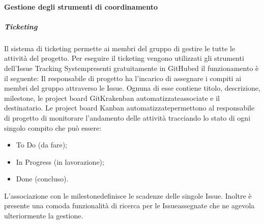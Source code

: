 			\paragraph{Gestione degli strumenti di coordinamento}
				\subparagraph*{Ticketing}
					Il sistema di ticketing permette ai membri del gruppo di gestire le tutte le attività del progetto.
					Per eseguire il ticketing vengono utilizzati gli strumenti dell'Issue Tracking System\glosp presenti gratuitamente in GitHub\glosp ed il funzionamento è il seguente:
					Il responsabile di progetto ha l'incarico di assegnare i compiti ai membri del gruppo attraverso le Issue\glosp. Ognuna di esse contiene titolo, descrizione,  milestone\glosp, le project board GitKrakenban automatizzate\glosp associate e il destinatario.
					Le project board Kanban automatizzate\glosp permettono al responsabile di progetto di monitorare l'andamento delle attività tracciando lo stato di ogni singolo compito che può essere:
					\begin{itemize}
						\item To Do (da fare);
						\item In Progress (in lavorazione);
						\item Done (concluso).
					\end{itemize}
					L'associazione con le milestone\glosp definisce le scadenze delle singole Issue\glosp.
					Inoltre è presente una comoda funzionalità di ricerca per le Issue\glosp assegnate che ne agevola ulteriormente la gestione.
